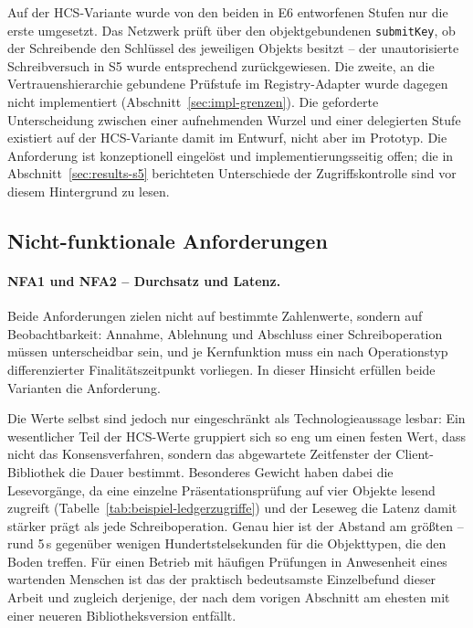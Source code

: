 Auf der HCS-Variante wurde von den beiden in E6 entworfenen Stufen nur die erste umgesetzt. Das Netzwerk prüft über den objektgebundenen \texttt{submitKey}, ob der Schreibende den Schlüssel des jeweiligen Objekts besitzt -- der unautorisierte Schreibversuch in S5 wurde entsprechend zurückgewiesen. Die zweite, an die Vertrauenshierarchie gebundene Prüfstufe im Registry-Adapter wurde dagegen nicht implementiert (Abschnitt~\ref{sec:impl-grenzen}). Die geforderte Unterscheidung zwischen einer aufnehmenden Wurzel und einer delegierten Stufe existiert auf der HCS-Variante damit im Entwurf, nicht aber im Prototyp. Die Anforderung ist konzeptionell eingelöst und implementierungsseitig offen; die in Abschnitt~\ref{sec:results-s5} berichteten Unterschiede der Zugriffskontrolle sind vor diesem Hintergrund zu lesen.

\subsection{Nicht-funktionale Anforderungen}
\label{subsec:results-nfa}

\paragraph{NFA1 und NFA2 -- Durchsatz und Latenz.} Beide Anforderungen zielen nicht auf bestimmte Zahlenwerte, sondern auf Beobachtbarkeit: Annahme, Ablehnung und Abschluss einer Schreiboperation müssen unterscheidbar sein, und je Kernfunktion muss ein nach Operationstyp differenzierter Finalitätszeitpunkt vorliegen. In dieser Hinsicht erfüllen beide Varianten die Anforderung.

Die Werte selbst sind jedoch nur eingeschränkt als Technologieaussage lesbar: Ein wesentlicher Teil der HCS-Werte gruppiert sich so eng um einen festen Wert, dass nicht das Konsensverfahren, sondern das abgewartete Zeitfenster der Client-Bibliothek die Dauer bestimmt. Besonderes Gewicht haben dabei die Lesevorgänge, da eine einzelne Präsentationsprüfung auf vier Objekte lesend zugreift (Tabelle~\ref{tab:beispiel-ledgerzugriffe}) und der Leseweg die Latenz damit stärker prägt als jede Schreiboperation. Genau hier ist der Abstand am größten -- rund 5\,s gegenüber wenigen Hundertstelsekunden für die Objekttypen, die den Boden treffen. Für einen Betrieb mit häufigen Prüfungen in Anwesenheit eines wartenden Menschen ist das der praktisch bedeutsamste Einzelbefund dieser Arbeit und zugleich derjenige, der nach dem vorigen Abschnitt am ehesten mit einer neueren Bibliotheksversion entfällt.

